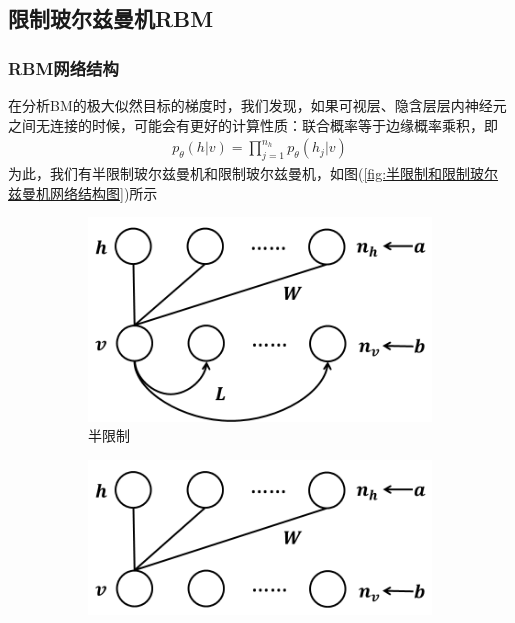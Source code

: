 {    \subsection{限制玻尔兹曼机RBM}
        \subsubsection{RBM网络结构}
            \par
            在分析BM的极大似然目标的梯度时，我们发现，如果可视层、隐含层层内神经元之间无连接的时候，可能会有更好的计算性质：联合概率等于边缘概率乘积，即
            \begin{align*}
            p_\theta(h|v) = \prod_{j=1}^{n_h}p_\theta(h_j|v)
            \end{align*}
            为此，我们有半限制玻尔兹曼机和限制玻尔兹曼机，如图(\ref{fig:半限制和限制玻尔兹曼机网络结构图})所示
\begin{figure}[H]
    \centering
    \begin{subfigure}[b]{0.4\textwidth}
        \includegraphics[width=\textwidth]{images/half_limit_and_limit_Boltzmann_machine_net_structure1.jpg}
        \caption{半限制}
        \label{fig:半限制}
    \end{subfigure}
    \quad
    \begin{subfigure}[b]{0.4\textwidth}
        \includegraphics[width=\textwidth]{images/half_limit_and_limit_Boltzmann_machine_net_structure2.jpg}

\end{subfigure}
\end{figure}}
